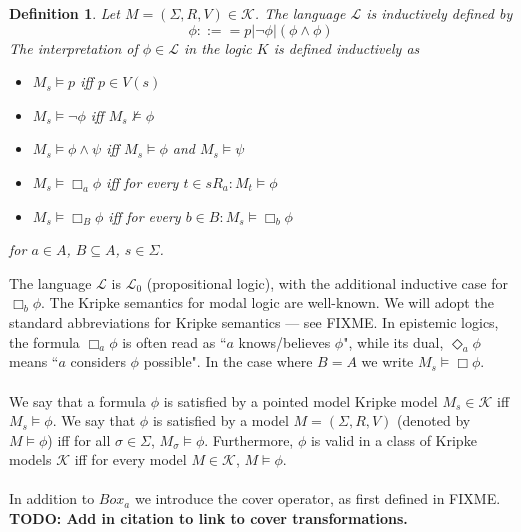 \documentclass[12pt, a4paper, titlepage]{scrartcl}
\newtheorem{defn}{Definition}[section]
\numberwithin{equation}{section}
\newcommand{\lang}{\mathcal{L}}
\newcommand{\langProp}{\lang_0}
\newcommand{\kripkeClass}{\mathcal{K}}
\begin{document}
\begin{defn} \label{modalLogic}
Let $M = (\Sigma, R, V) \in \kripkeClass$.
The language $\lang$ is inductively defined by
\[
	\phi ::== p | \neg \phi | (\phi \land \phi)
\]
The interpretation of $\phi \in \lang$ in the logic $K$ is defined inductively as
\begin{itemize}
	\item $M_s \models p$ iff $p \in V(s)$
	\item $M_s \models \neg \phi$ iff $M_s \not \models \phi$
	\item $M_s \models \phi \land \psi$ iff $M_s \models \phi$ and $M_s \models \psi$
	\item $M_s \models \Box_a \phi$ iff for every $t \in s R_a: M_t \models \phi$
	\item $M_s \models \Box_B \phi$ iff for every $b \in B : M_s \models \Box_b \phi$
\end{itemize}
for $a \in A$, $B \subseteq A$, $s \in \Sigma$.
\end{defn}
The language $\lang$ is $\langProp$ (propositional logic), with the additional inductive case for
$\Box_b \phi$.
The Kripke semantics for modal logic are well-known.
We will adopt the standard abbreviations for Kripke semantics --- see FIXME.
In epistemic logics, the formula $\Box_a \phi$ is often read as ``$a$ knows/believes $\phi$", while
its dual, $\Diamond_a \phi$ means ``$a$ considers $\phi$ possible".
In the case where $B = A$ we write $M_s \models \Box \phi$.\\
\\
We say that a formula $\phi$ is satisfied by a pointed model Kripke model $M_s \in \kripkeClass$ iff
$M_s \models \phi$.
We say that $\phi$ is satisfied by a model $M = (\Sigma, R, V)$ (denoted by $M \models \phi$) iff
for all $\sigma \in \Sigma$, $M_\sigma \models \phi$.
Furthermore, $\phi$ is valid in a class of Kripke models $\kripkeClass$ iff for every model $M \in
\kripkeClass$, $M \models \phi$.\\
\\
In addition to $Box_a$ we introduce the cover operator, as first defined in FIXME.
{\bf TODO: Add in citation to link to cover transformations. }
\end{document}
